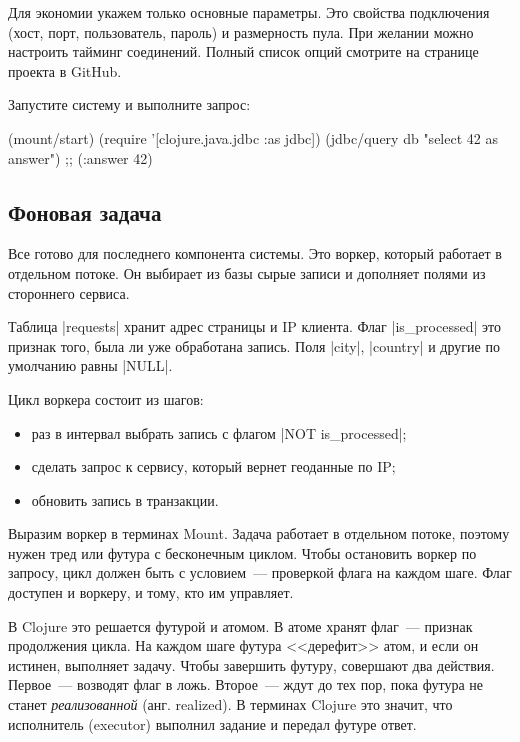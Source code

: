 Для экономии укажем только основные параметры. Это свойства подключения (хост,
порт, пользователь, пароль) и размерность пула. При желании можно настроить
тайминг соединений. Полный список опций смотрите на странице проекта в GitHub.

Запустите систему и выполните запрос:

\begin{english}
  \begin{clojure}
(mount/start)
(require '[clojure.java.jdbc :as jdbc])
(jdbc/query db "select 42 as answer")
;; ({:answer 42})
  \end{clojure}
\end{english}

\subsection{Фоновая задача}

\label{worker}

Все готово для последнего компонента системы. Это воркер, который работает в
отдельном потоке. Он выбирает из базы сырые записи и дополняет полями из
стороннего сервиса.

Таблица \spverb|requests| хранит адрес страницы и IP клиента. Флаг
\spverb|is_processed| это признак того, была ли уже обработана запись. Поля
\spverb|city|, \spverb|country| и другие по умолчанию равны \spverb|NULL|.

Цикл воркера состоит из шагов:

\begin{itemize}

\item
  раз в интервал выбрать запись с флагом \spverb|NOT is_processed|;

\item
  сделать запрос к сервису, который вернет геоданные по IP;

\item
  обновить запись в транзакции.

\end{itemize}

Выразим воркер в терминах Mount. Задача работает в отдельном потоке, поэтому
нужен тред или футура с бесконечным циклом. Чтобы остановить воркер по запросу,
цикл должен быть с условием~--- проверкой флага на каждом шаге. Флаг доступен и
воркеру, и тому, кто им управляет.

В Clojure это решается футурой и атомом. В атоме хранят флаг~--- признак
продолжения цикла. На каждом шаге футура <<дерефит>> атом, и если он истинен,
выполняет задачу. Чтобы завершить футуру, совершают два действия. Первое~---
возводят флаг в ложь. Второе~--- ждут до тех пор, пока футура не станет
\emph{реализованной} (анг. realized). В терминах Clojure это значит, что
исполнитель (executor) выполнил задание и передал футуре ответ.

